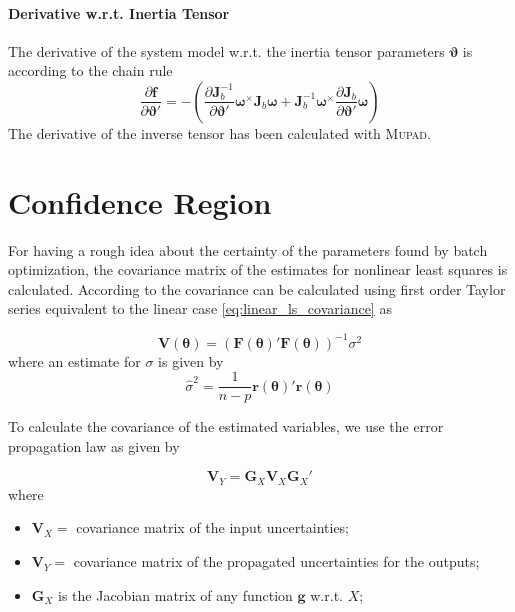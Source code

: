 \paragraph{Derivative w.r.t. Inertia Tensor\\}
The derivative of the system model w.r.t. the inertia tensor parameters $\boldsymbol{\vartheta}$ is
according to the chain rule
\begin{equation}
\frac{\partial \mathbf{f}}{\partial \boldsymbol{\vartheta}'} =
-
\left(
\frac{\partial \mathbf{J}_b^{-1}}{\partial \boldsymbol{\vartheta}'}
\boldsymbol{\omega} ^\times \mathbf{J}_b \boldsymbol{\omega}
+
\mathbf{J}_b^{-1}
\boldsymbol{\omega} ^\times \frac{\partial \mathbf{J}_b}{\partial \boldsymbol{\vartheta}'} \boldsymbol{\omega}
\right)
\end{equation}
The derivative of the inverse tensor has been calculated with \textsc{Mupad}.
\\

\section{Confidence Region}
\label{sec:confidence_region}
For having a rough idea about the certainty of the parameters found by batch optimization, the covariance matrix of the estimates for nonlinear least squares is calculated.
According to \citet[chap. 2]{Seber} the covariance can be calculated using first order Taylor series equivalent to the linear case \cref{eq:linear_ls_covariance} as

\begin{equation}
\label{eq:nlls_covariance}
\mathbf{V}(\boldsymbol{\theta}) = (\mathbf{F}(\boldsymbol{\theta})'\mathbf{F}(\boldsymbol{\theta})) ^{-1} \sigma^2
\end{equation}
where an estimate for $\sigma$ is given by
\begin{equation*}
\hat{\sigma}^2 = \frac{1}{n-p} \mathbf{r}(\boldsymbol{\theta})' \mathbf{r}(\boldsymbol{\theta})
\end{equation*}

To calculate the covariance of the estimated variables, we use the error propagation law as given by \citet[eq. 4.15]{Siegwart}

\begin{equation}
\label{eq:error_propagation_law}
\mathbf{V}_Y = \mathbf{G}_X \mathbf{V}_X \mathbf{G}_X'
\end{equation}
where
\begin{itemize}
\item[] $\mathbf{V}_X =$ covariance matrix of the input uncertainties;
\item[] $\mathbf{V}_Y =$ covariance matrix of the propagated uncertainties for the outputs;
\item[] $\mathbf{G}_X  $ is the Jacobian matrix of any function $\mathbf{g}$ w.r.t. $X$;
\end{itemize}

